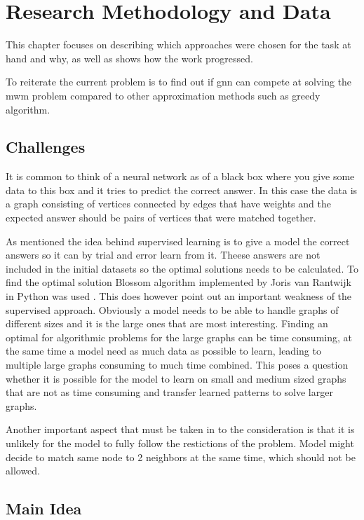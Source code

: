 \chapter{Research Methodology and Data}

This chapter focuses on describing which approaches were chosen for the task at hand and why, as well as shows how the work progressed. 

To reiterate the current problem is to find out if \gls{gnn} can compete at solving the \gls{mwm} problem compared to other approximation methods such as greedy algorithm.

\section{Challenges}

It is common to think of a neural network as of a black box where you give some data to this box and it tries to predict the correct answer. In this case the data is a graph consisting of vertices connected by edges that have weights and the expected answer should be pairs of vertices that were matched together.

As mentioned the idea behind supervised learning is to give a model the correct answers so it can by trial and error learn from it. Theese answers are not included in the initial datasets so the optimal solutions needs to be calculated. To find the optimal solution Blossom algorithm implemented by Joris van Rantwijk in Python was used \cite{mwmBlossom}. This does however point out an important weakness of the supervised approach. Obviously a model needs to be able to handle graphs of different sizes and it is the large ones that are most interesting. Finding an optimal for algorithmic problems for the large graphs can be time consuming, at the same time a model need as much data as possible to learn, leading to multiple large graphs consuming to much time combined. This poses a question whether it is possible for the model to learn on small and medium sized graphs that are not as time consuming and transfer learned patterns to solve larger graphs.

Another important aspect that must be taken in to the consideration is that it is unlikely for the model to fully follow the restictions of the problem. Model might decide to match same node to 2 neighbors at the same time, which should not be allowed. 

\section{Main Idea}

